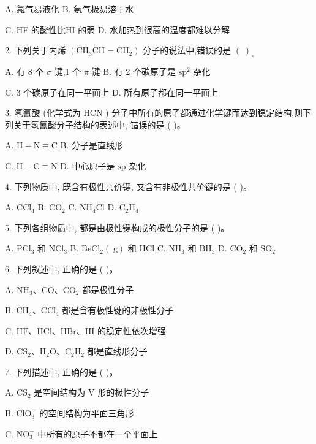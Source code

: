 \documentclass[10pt]{article}
\begin{document}
A. 氯气易液化 B. 氨气极易溶于水

C. HF 的酸性比HI 的弱 D. 水加热到很高的温度都难以分解

2. 下列关于丙烯 \(\left( {{\mathrm{{CH}}}_{3}\mathrm{{CH}} = {\mathrm{{CH}}}_{2}}\right)\) 分子的说法中,错误的是 \({\left( \;\right) }_{ \circ }\)

A. 有 8 个 \(\sigma\) 键,1 个 \(\pi\) 键 B. 有 2 个碳原子是 \({\mathrm{{sp}}}^{2}\) 杂化

C. 3 个碳原子在同一平面上 D. 所有原子都在同一平面上

3. 氢氰酸 (化学式为 \(\mathrm{{HCN}}\) ) 分子中所有的原子都通过化学键而达到稳定结构,则下列关于氢氰酸分子结构的表述中, 错误的是 ( )。

A. \(\mathrm{H} - \mathrm{N} \equiv \mathrm{C}\) B. 分子是直线形

C. \(\mathrm{H} - \mathrm{C} \equiv \mathrm{N}\) D. 中心原子是 \(\mathrm{{sp}}\) 杂化

4. 下列物质中, 既含有极性共价键, 又含有非极性共价键的是 ( )。

A. \({\mathrm{{CCl}}}_{4}\) B. \({\mathrm{{CO}}}_{2}\) C. \({\mathrm{{NH}}}_{4}\mathrm{{Cl}}\) D. \({\mathrm{C}}_{2}{\mathrm{H}}_{4}\)

5. 下列各组物质中, 都是由极性键构成的极性分子的是 ( )。

A. \({\mathrm{{PCl}}}_{3}\) 和 \({\mathrm{{NCl}}}_{3}\) B. \({\mathrm{{BeCl}}}_{2}\left( \mathrm{\;g}\right)\) 和 \(\mathrm{{HCl}}\) C. \({\mathrm{{NH}}}_{3}\) 和 \({\mathrm{{BH}}}_{3}\) D. \({\mathrm{{CO}}}_{2}\) 和 \({\mathrm{{SO}}}_{2}\)

6. 下列叙述中, 正确的是 ( )。

A. \({\mathrm{{NH}}}_{3}\text{、}\mathrm{{CO}}\text{、}{\mathrm{{CO}}}_{2}\) 都是极性分子

B. \({\mathrm{{CH}}}_{4}\text{、}{\mathrm{{CCl}}}_{4}\) 都是含有极性键的非极性分子

C. \(\mathrm{{HF}}\text{、}\mathrm{{HCl}}\text{、}\mathrm{{HBr}}\text{、}\mathrm{{HI}}\) 的稳定性依次增强

D. \({\mathrm{{CS}}}_{2}\text{、}{\mathrm{H}}_{2}\mathrm{O}\text{、}{\mathrm{C}}_{2}{\mathrm{H}}_{2}\) 都是直线形分子

7. 下列描述中, 正确的是 ( )。

A. \({\mathrm{{CS}}}_{2}\) 是空间结构为 \(\mathrm{V}\) 形的极性分子

B. \({\mathrm{{ClO}}}_{3}^{ - }\) 的空间结构为平面三角形

C. \({\mathrm{{NO}}}_{3}^{ - }\) 中所有的原子不都在一个平面上
\end{document}
